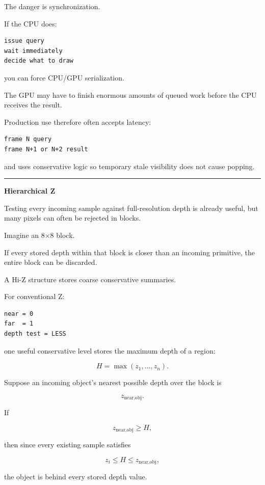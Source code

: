 The danger is synchronization.

If the CPU does:

\begin{verbatim}
issue query
wait immediately
decide what to draw
\end{verbatim}

you can force CPU/GPU serialization.

The GPU may have to finish enormous amounts of queued work before the CPU receives the result.

Production use therefore often accepts latency:

\begin{verbatim}
frame N query
frame N+1 or N+2 result
\end{verbatim}

and uses conservative logic so temporary stale visibility does not cause popping.

\begin{center}\rule{0.5\linewidth}{0.5pt}\end{center}

\textbf{Hierarchical Z}

Testing every incoming sample against full-resolution depth is already useful, but many pixels can often be rejected in blocks.

Imagine an 8×8 block.

If every stored depth within that block is closer than an incoming primitive, the entire block can be discarded.

A Hi-Z structure stores coarse conservative summaries.

For conventional Z:

\begin{verbatim}
near = 0
far  = 1
depth test = LESS
\end{verbatim}

one useful conservative level stores the maximum depth of a region:

\[
H=\max(z_1,\dots,z_n).
\]

Suppose an incoming object's nearest possible depth over the block is

\[
z_{\text{near,obj}}.
\]

If

\[
z_{\text{near,obj}}\ge H,
\]

then since every existing sample satisfies

\[
z_i\le H\le z_{\text{near,obj}},
\]

the object is behind every stored depth value.

